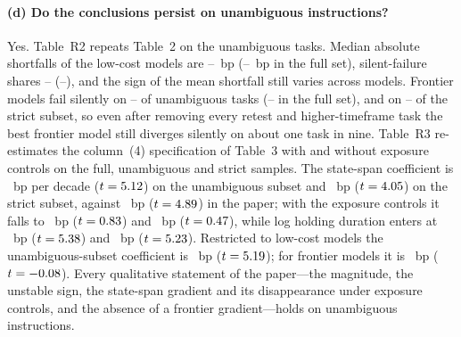 \documentclass[11pt,a4paper]{article}
\begin{document}
\paragraph{(d) Do the conclusions persist on unambiguous instructions?} Yes. Table~R2 repeats Table~2 on the \RevUnambCount{} unambiguous tasks. Median absolute shortfalls of the low-cost models are \RevUnambGptISMed--\RevUnambQwenSISMed~bp (\RevAllGptISMed--\RevAllQwenSISMed~bp in the full set), silent-failure shares \RevUnambQwenSSilent--\RevUnambHaikuSilent{} (\RevAllQwenSSilent--\RevAllHaikuSilent), and the sign of the mean shortfall still varies across models. Frontier models fail silently on \RevUnambOpusSilent--\RevUnambDSProSilent{} of unambiguous tasks (\RevAllOpusSilent--\RevAllDSProSilent{} in the full set), and on \RevStrictOpusSilent--\RevStrictDSProSilent{} of the strict subset, so even after removing every retest and higher-timeframe task the best frontier model still diverges silently on about one task in nine. Table~R3 re-estimates the column~(4) specification of Table~3 with and without exposure controls on the full, unambiguous and strict samples. The state-span coefficient is \RevUnambTau~bp per decade ($t=5.12$) on the unambiguous subset and \RevStrictTau~bp ($t=4.05$) on the strict subset, against \RevFullTau~bp ($t=4.89$) in the paper; with the exposure controls it falls to \RevUnambExpoTau~bp ($t=0.83$) and \RevStrictExpoTau~bp ($t=0.47$), while log holding duration enters at \RevUnambExpoDur~bp ($t=5.38$) and \RevStrictExpoDur~bp ($t=5.23$). Restricted to low-cost models the unambiguous-subset coefficient is \RevUnambLowTau~bp ($t=5.19$); for frontier models it is \RevUnambFrontTau~bp ($t=-0.08$). Every qualitative statement of the paper---the magnitude, the unstable sign, the state-span gradient and its disappearance under exposure controls, and the absence of a frontier gradient---holds on unambiguous instructions.

\begin{table}[h]\centering\footnotesize
\caption*{\textbf{Table R2.} Table~2 of the manuscript restricted to the \RevUnambCount{} unambiguous tasks. Columns as in Table~2; mean $IS=R^{\mathrm{ref}}-R^{\mathrm{llm}}$ with unclustered $t$-statistic in brackets.}

\end{table}

\begin{table}[h]\centering\small
\caption*{\textbf{Table R3.} Table~3, column (4) specification (dependent variable $|IS|$ in bp, winsorised 1/99 within instrument; model, instrument and building-block fixed effects; controls $K$, log trade count, McCabe), estimated on all tasks, on the unambiguous subset and on the strict subset, without and with the two exposure controls. Strategy-clustered $t$-statistics in parentheses.}
\resizebox{\textwidth}{!}{}
\end{table}
\end{document}
